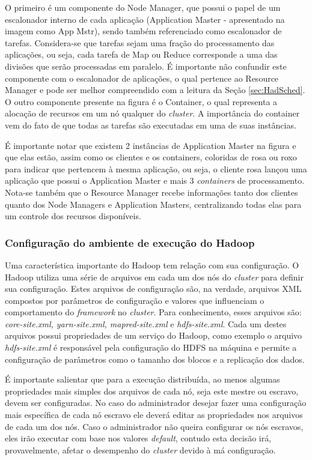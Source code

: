 O primeiro é um componente do Node Manager, que possui o papel de um escalonador interno de cada aplicação (Application Master - apresentado na imagem como App Mstr), sendo também referenciado como escalonador de tarefas. Considera-se que tarefas sejam uma fração do processamento das aplicações, ou seja, cada tarefa de Map ou Reduce corresponde a uma das divisões que serão processadas em paralelo. É importante não confundir este componente com o escalonador de aplicações, o qual pertence ao Resource Manager e pode ser melhor compreendido com a leitura da Seção \ref{sec:HadSched}. O outro componente presente na figura é o Container, o qual representa a alocação de recursos em um nó qualquer do \textit{cluster}. A importância do container vem do fato de que todas as tarefas são executadas em uma de suas instâncias.

É importante notar que existem 2 instâncias de Application Master na figura e que elas estão, assim como os clientes e os containers, coloridas de rosa ou roxo para indicar que pertencem à mesma aplicação, ou seja, o cliente rosa lançou uma aplicação que possui o Application Master e mais 3 \textit{containers} de processamento. Nota-se também que o Resource Manager recebe informações tanto dos clientes quanto dos Node Managers e Application Masters, centralizando todas elas para um controle dos recursos disponíveis.

\subsubsection{Configuração do ambiente de execução do Hadoop}
Uma característica importante do Hadoop tem relação com sua configuração. O Hadoop utiliza uma série de arquivos em cada um dos nós do \textit{cluster} para definir sua configuração. Estes arquivos de configuração são, na verdade, arquivos XML compostos por parâmetros de configuração e valores que influenciam o comportamento do \textit{framework} no \textit{cluster}. Para conhecimento, esses arquivos são: \textit{core-site.xml, yarn-site.xml, mapred-site.xml} e \textit{hdfs-site.xml}. Cada um destes arquivos possui propriedades de um serviço do Hadoop, como exemplo o arquivo \textit{hdfs-site.xml} é responsável pela configuração do HDFS na máquina e permite a configuração de parâmetros como o tamanho dos blocos e a replicação dos dados.

É importante salientar que para a execução distribuída, ao menos algumas propriedades mais simples dos arquivos de cada nó, seja este mestre ou escravo, devem ser configuradas. No caso do administrador desejar fazer uma configuração mais específica de cada nó escravo ele deverá editar as propriedades nos arquivos de cada um dos nós. Caso o administrador não queira configurar os nós escravos, eles irão executar com base nos valores \textit{default}, contudo esta decisão irá, provavelmente, afetar o desempenho do \textit{cluster} devido à má configuração.

